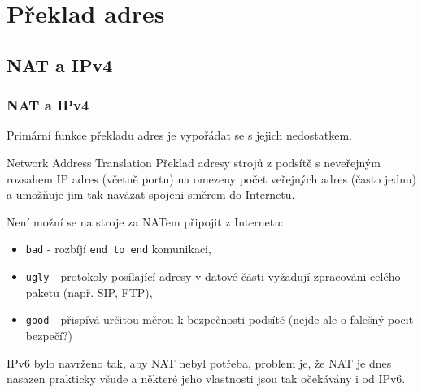 \documentclass{beamer}
\begin{document}
\section{Překlad adres} 
\subsection{NAT a IPv4}
\begin{frame} \frametitle{NAT a IPv4}

Primární funkce překladu adres je vypořádat se s jejich nedostatkem.

\begin{block}{Network Address Translation}
Překlad adresy strojů z podsítě s neveřejným rozsahem IP adres (včetně portu) na omezeny počet veřejných adres (často jednu) a
umožňuje jim tak navázat spojeni směrem do Internetu.
\end{block}

Není možní se na stroje za NATem připojit z Internetu:
\begin{itemize}
\item \texttt{bad} - rozbíjí \texttt{end to end} komunikaci,
\item \texttt{ugly} - protokoly posílající adresy v datové části vyžadují zpracováni celého paketu (např. SIP, FTP),
\item \texttt{good} - přispívá určitou měrou k bezpečnosti podsítě (nejde ale o falešný pocit bezpečí?)
\end{itemize}


IPv6 bylo navrženo tak, aby NAT nebyl potřeba, problem je, že NAT je dnes nasazen prakticky všude
a některé jeho vlastnosti jsou tak očekávány i od IPv6.
\end{frame}
\end{document}
